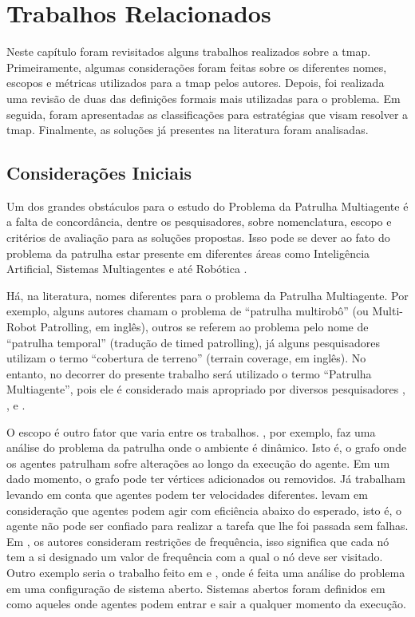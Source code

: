 \chapter{Trabalhos Relacionados}
\label{chp:background}

Neste capítulo foram revisitados alguns trabalhos realizados sobre a \ac{tmap}. 
Primeiramente, algumas considerações foram feitas sobre os diferentes nomes,  
escopos e métricas utilizados para a \ac{tmap} pelos autores. Depois, foi 
realizada uma revisão de duas das definições formais mais utilizadas para o 
problema. Em seguida, foram apresentadas as classificações para estratégias 
que visam resolver a \ac{tmap}. Finalmente, as soluções já presentes na 
literatura foram analisadas.

\section{Considerações Iniciais}
\label{sec:consideracoesIniciais}

Um dos grandes obstáculos para o estudo do Problema da Patrulha Multiagente é a 
falta de concordância, dentre os pesquisadores, sobre nomenclatura, escopo e 
critérios de avaliação para as soluções propostas. Isso pode se dever ao fato do 
problema da patrulha estar presente em diferentes áreas como Inteligência 
Artificial, Sistemas Multiagentes e até Robótica \citep{sampaiophd}.

Há, na literatura, nomes diferentes para o problema da Patrulha Multiagente. Por 
exemplo, alguns autores \citep{hernandez2013game} chamam o problema de “patrulha 
multirobô” (ou Multi-Robot Patrolling, em inglês), outros \citep{6495145} se 
referem ao problema pelo nome de “patrulha temporal” (tradução de timed 
patrolling), já alguns pesquisadores \citep{Koenig:2001:TCA:375735.376463} 
utilizam o termo “cobertura de terreno” (terrain coverage, em inglês). No 
entanto, no decorrer do presente trabalho será utilizado o termo “Patrulha 
Multiagente”, pois ele é considerado mais apropriado por diversos pesquisadores 
\citep{6900280}, \citep{sampaiophd}, e \citep{6315145}.

O escopo é outro fator que varia entre os trabalhos. \citep{6615158}, por 
exemplo, faz uma análise do problema da patrulha onde o ambiente é dinâmico. 
Isto é, o grafo onde os agentes patrulham sofre alterações ao longo da execução 
do agente. Em um dado momento, o grafo pode ter vértices adicionados ou 
removidos. Já \citep{6900280} trabalham levando em conta que agentes podem ter 
velocidades diferentes. \citep{Pippin:2013:PBT:2480362.2480378} 
levam em consideração que agentes podem agir com eficiência abaixo do esperado, 
isto é, o agente não pode ser confiado para realizar a tarefa que lhe foi 
passada sem falhas. Em \citep{4209122}, os autores consideram restrições de 
frequência, isso significa que cada nó tem a si designado um valor de frequência 
com a qual o nó deve ser visitado. Outro exemplo seria o trabalho feito 
em \citep{6495145} e \citep{Poulet:2012:b}, onde é feita uma análise do problema 
em uma configuração de sistema aberto. Sistemas abertos foram definidos em 
\citep{6040660} como aqueles onde agentes podem entrar e sair a qualquer momento 
da execução.

